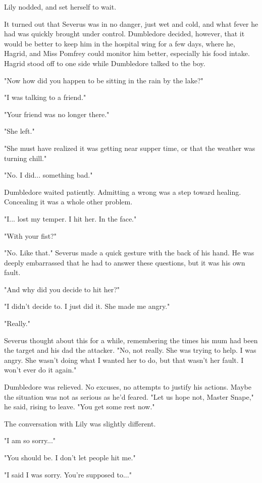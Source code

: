 \documentclass[a4paper,11pt]{article}
\begin{document}
Lily nodded, and set herself to wait.

It turned out that Severus was in no danger, just wet and cold, and what fever he had was quickly brought under control. Dumbledore decided, however, that it would be better to keep him in the hospital wing for a few days, where he, Hagrid, and Miss Pomfrey could monitor him better, especially his food intake. Hagrid stood off to one side while Dumbledore talked to the boy.

"Now how did you happen to be sitting in the rain by the lake?"

"I was talking to a friend."

"Your friend was no longer there."

"She left."

"She must have realized it was getting near supper time, or that the weather was turning chill."

"No. I did... something bad."

Dumbledore waited patiently. Admitting a wrong was a step toward healing. Concealing it was a whole other problem.

"I... lost my temper. I hit her. In the face."

"With your fist?"

"No. Like that." Severus made a quick gesture with the back of his hand. He was deeply embarrassed that he had to answer these questions, but it was his own fault.

"And why did you decide to hit her?"

"I didn't decide to. I just did it. She made me angry."

"Really."

Severus thought about this for a while, remembering the times his mum had been the target and his dad the attacker. "No, not really. She was trying to help. I was angry. She wasn't doing what I wanted her to do, but that wasn't her fault. I won't ever do it again."

Dumbledore was relieved. No excuses, no attempts to justify his actions. Maybe the situation was not as serious as he'd feared. "Let us hope not, Master Snape," he said, rising to leave. "You get some rest now."

The conversation with Lily was slightly different.

"I am so sorry..."

"You should be. I don't let people hit me."

"I said I was sorry. You're supposed to..."
\end{document}
